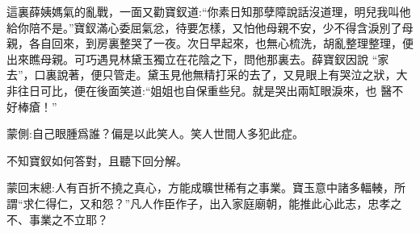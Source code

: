\begin{parag}
    這裏薛姨媽氣的亂戰，一面又勸寶釵道:“你素日知那孽障說話沒道理，明兒我叫他給你陪不是。”寶釵滿心委屈氣忿，待要怎樣，又怕他母親不安，少不得含淚別了母親，各自回來，到房裏整哭了一夜。次日早起來，也無心梳洗，胡亂整理整理，便出來瞧母親。可巧遇見林黛玉獨立在花陰之下，問他那裏去。薛寶釵因說 “家去”，口裏說著，便只管走。黛玉見他無精打采的去了，又見眼上有哭泣之狀，大非往日可比，便在後面笑道:“姐姐也自保重些兒。就是哭出兩缸眼淚來，也 醫不好棒瘡！”\begin{note}蒙側:自己眼腫爲誰？偏是以此笑人。笑人世間人多犯此症。\end{note}不知寶釵如何答對，且聽下回分解。
\end{parag}


\begin{parag}
    \begin{note}蒙回末總:人有百折不撓之真心，方能成曠世稀有之事業。寶玉意中諸多輻輳，所謂“求仁得仁，又和怨？”凡人作臣作子，出入家庭廟朝，能推此心此志，忠孝之不、事業之不立耶？\end{note}
\end{parag}

